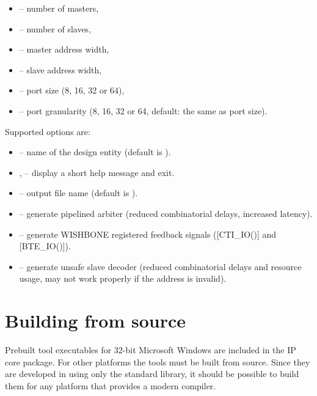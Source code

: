 \documentclass[a4paper,12pt,twoside,extrafontsizes]{memoir}
\begin{document}
\begin{itemize}
	\item{} -- number of masters,
	\item{} -- number of slaves,
	\item{} -- master address width,
	\item{} -- slave address width,
	\item{} -- port size (8, 16, 32 or 64),
	\item{} -- port granularity (8, 16, 32 or 64, default: the same as port size).
\end{itemize}

Supported options are:

\begin{itemize}
	\item {} -- name of the design entity (default is ).
	
	\item {},  -- display a short help message and exit.
	
	\item {} -- output file name (default is ).
	
	\item {} -- generate pipelined arbiter (reduced combinatorial delays, increased latency).
	
	\item {} -- generate WISHBONE registered feedback signals ([CTI\_IO()] and [BTE\_IO()]).
	
	\item {} -- generate unsafe slave decoder (reduced combinatorial delays and resource usage, may not work properly if the address is invalid).
\end{itemize}

\section{Building from source}
\label{sec:buildfromsource}

Prebuilt tool executables for 32-bit Microsoft\textregistered{} Windows\textregistered{} are included in the \lxp{} IP core package. For other platforms the tools must be built from source. Since they are developed in \cplusplus{} using only the standard library, it should be possible to build them for any platform that provides a modern \cplusplus{} compiler.
\end{document}
